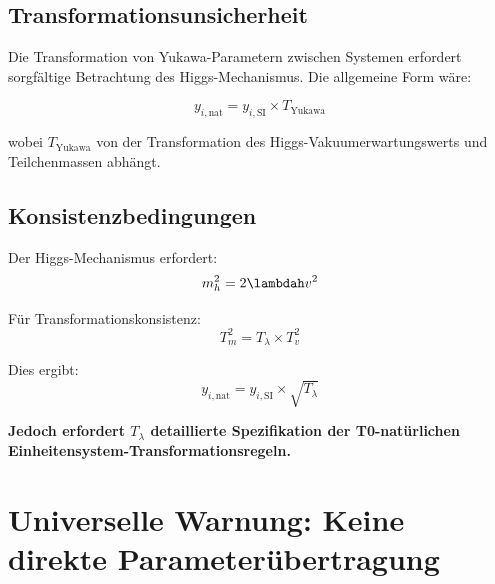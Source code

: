 	\begin{table}[htbp]
		\centering
		\caption{Yukawa-Kopplungshierarchie (5 Größenordnungen Variation)}
		\label{tab:yukawa_hierarchie}
	\end{table}
	
	\subsection{Transformationsunsicherheit}
	\label{subsec:yukawa_transformation}
	
	Die Transformation von Yukawa-Parametern zwischen Systemen erfordert sorgfältige Betrachtung des Higgs-Mechanismus. Die allgemeine Form wäre:
	
	$$y_{i,\text{nat}} = y_{i,\text{SI}} \times T_{\text{Yukawa}}$$
	
	wobei $T_{\text{Yukawa}}$ von der Transformation des Higgs-Vakuumerwartungswerts und Teilchenmassen abhängt.
	
	\subsection{Konsistenzbedingungen}
	\label{subsec:yukawa_konsistenz}
	
	Der Higgs-Mechanismus erfordert:
	$$m_h^2 = 2\lambdah v^2$$
	
	Für Transformationskonsistenz:
	$$T_m^2 = T_\lambda \times T_v^2$$
	
	Dies ergibt:
	$$y_{i,\text{nat}} = y_{i,\text{SI}} \times \sqrt{T_\lambda}$$
	
	\textbf{Jedoch erfordert $T_\lambda$ detaillierte Spezifikation der T0-natürlichen Einheitensystem-Transformationsregeln.}
	
	\section{Universelle Warnung: Keine direkte Parameterübertragung}
	\label{sec:universelle_warnung}
	
